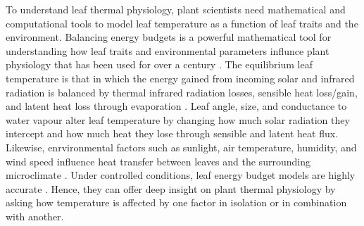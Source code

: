 \documentclass[11pt, oneside]{article}
\begin{document}
To understand leaf thermal physiology, plant scientists need mathematical and computational tools to model leaf temperature as a function of leaf traits and the environment. Balancing energy budgets is a powerful mathematical tool for understanding how leaf traits and environmental parameters influnce plant physiology that has been used for over a century \citep{Raschke_1960}. The equilibrium leaf temperature is that in which the energy gained from incoming solar and infrared radiation is balanced by thermal infrared radiation losses, sensible heat loss/gain, and latent heat loss through evaporation \citep{Gutschick_2016}. Leaf angle, size, and conductance to water vapour alter leaf temperature by changing how much solar radiation they intercept and how much heat they lose through sensible and latent heat flux. Likewise, enrvironmental factors such as sunlight, air temperature, humidity, and wind speed influence heat transfer between leaves and the surrounding microclimate \citep{Gutschick_2016}. Under controlled conditions, leaf energy budget models are highly accurate \citep{Schymanski_Or_2017}. Hence, they can offer deep insight on plant thermal physiology by asking how temperature is affected by one factor in isolation or in combination with another.
\end{document}

